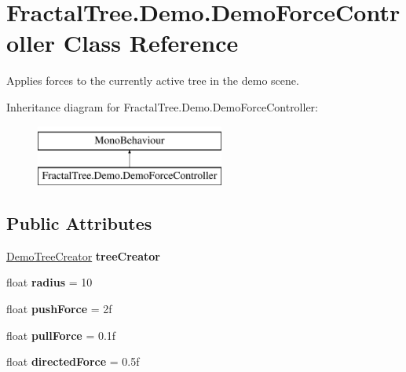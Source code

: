 \hypertarget{class_fractal_tree_1_1_demo_1_1_demo_force_controller}{}\section{Fractal\+Tree.\+Demo.\+Demo\+Force\+Controller Class Reference}
\label{class_fractal_tree_1_1_demo_1_1_demo_force_controller}


Applies forces to the currently active tree in the demo scene.  


Inheritance diagram for Fractal\+Tree.\+Demo.\+Demo\+Force\+Controller\+:\begin{figure}[H]
\begin{center}
\leavevmode
\includegraphics[height=2.000000cm]{class_fractal_tree_1_1_demo_1_1_demo_force_controller}
\end{center}
\end{figure}
\subsection*{Public Attributes}
\begin{DoxyCompactItemize}
\item 
\mbox{\label{class_fractal_tree_1_1_demo_1_1_demo_force_controller_ab3ad5eba7a7a4f2d74e543572e2eb052}} 
\hyperlink{class_fractal_tree_1_1_demo_1_1_demo_tree_creator}{Demo\+Tree\+Creator} {\bfseries tree\+Creator}
\item 
\mbox{\label{class_fractal_tree_1_1_demo_1_1_demo_force_controller_ad23d270ac91d98230b4b99fe57a31c46}} 
float {\bfseries radius} = 10
\item 
\mbox{\label{class_fractal_tree_1_1_demo_1_1_demo_force_controller_acc0f4abc1f05d8de48bf509c51bfd2c2}} 
float {\bfseries push\+Force} = 2f
\item 
\mbox{\label{class_fractal_tree_1_1_demo_1_1_demo_force_controller_a05e469959fcc15a37563169ed7d21723}} 
float {\bfseries pull\+Force} = 0.\+1f
\item 
\mbox{\label{class_fractal_tree_1_1_demo_1_1_demo_force_controller_aa6e3af65965f03534e7a0a112dbf9c15}} 
float {\bfseries directed\+Force} = 0.\+5f
\end{DoxyCompactItemize}


